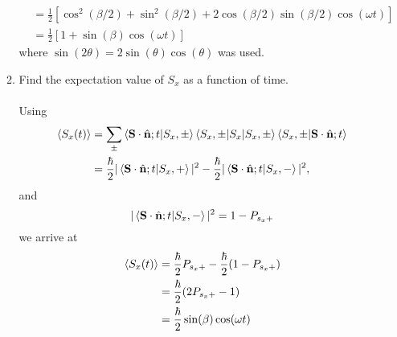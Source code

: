 \documentclass[11pt,letterpaper]{article}
\newcommand{\vect}[1]{\mathbf{#1}}
\begin{document}
\begin{enumerate}
\begin{enumerate}
\begin{align*}
&=\frac{1}{2}\left[\cos^2(\beta/2)+\sin^2(\beta/2) + 2\cos(\beta/2)\sin(\beta/2)\cos(\omega t)\right]\\
&= \frac{1}{2}[1 +\sin(\beta)\cos(\omega t)]
\end{align*}
where $\sin(2\theta) = 2\sin(\theta)\cos(\theta)$ was used.\\
\item Find the expectation value of $S_x$ as a function of time.
\\ \\Using
\begin{align*}\braket{S_x(t)}&=\sum_\pm{\braket{\vect S\cdot\hat{\vect n};t|S_x,\pm}\braket{S_x,\pm|S_x|S_x,\pm}\braket{S_x,\pm|\vect S\cdot\hat{\vect n};t}}\\
&= \frac{\hbar}{2}|\braket{\vect S\cdot\hat{\vect n};t|S_x,+}|^2-\frac{\hbar}{2}|\braket{\vect S\cdot\hat{\vect n};t|S_x,-}|^2,\end{align*}
and $$|\braket{\vect S\cdot\hat{\vect n};t|S_x,-}|^2= 1-P_{s_x+}$$
we arrive at 
\begin{align*}\braket{S_x(t)} &= \frac{\hbar}{2}P_{s_x+}-\frac{\hbar}{2}(1-P_{s_x+})\\
&=\frac{\hbar}{2}(2P_{s_x+}-1)\\
&=\frac{\hbar}{2}\sin(\beta)\cos(\omega t)
\end{align*}


\end{enumerate}
\end{enumerate}
\end{document}
